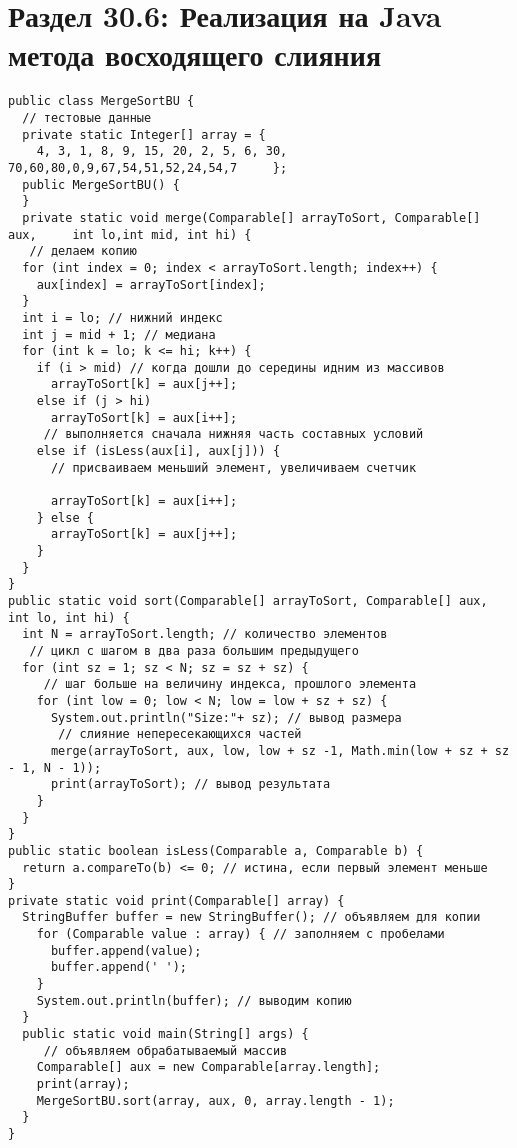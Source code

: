 \section*{Раздел 30.6: Реализация на Java метода восходящего слияния} 
\begin{tcolorbox}
\begin{verbatim}
public class MergeSortBU {
  // тестовые данные
  private static Integer[] array = { 
    4, 3, 1, 8, 9, 15, 20, 2, 5, 6, 30, 70,60,80,0,9,67,54,51,52,24,54,7     };
  public MergeSortBU() {
  }
  private static void merge(Comparable[] arrayToSort, Comparable[] aux,     int lo,int mid, int hi) {
   // делаем копию
  for (int index = 0; index < arrayToSort.length; index++) {
    aux[index] = arrayToSort[index];
  }
  int i = lo; // нижний индекс
  int j = mid + 1; // медиана
  for (int k = lo; k <= hi; k++) {
    if (i > mid) // когда дошли до середины идним из массивов
      arrayToSort[k] = aux[j++];
    else if (j > hi)
      arrayToSort[k] = aux[i++];
     // выполняется сначала нижняя часть составных условий
    else if (isLess(aux[i], aux[j])) {
      // присваиваем меньший элемент, увеличиваем счетчик

      arrayToSort[k] = aux[i++];
    } else {
      arrayToSort[k] = aux[j++];
    }
  }
}
public static void sort(Comparable[] arrayToSort, Comparable[] aux, int lo, int hi) {
  int N = arrayToSort.length; // количество элементов
   // цикл с шагом в два раза большим предыдущего
  for (int sz = 1; sz < N; sz = sz + sz) {
     // шаг больше на величину индекса, прошлого элемента
    for (int low = 0; low < N; low = low + sz + sz) {
      System.out.println("Size:"+ sz); // вывод размера
       // слияние непересекающихся частей
      merge(arrayToSort, aux, low, low + sz -1, Math.min(low + sz + sz - 1, N - 1));
      print(arrayToSort); // вывод результата
    }
  }
}
public static boolean isLess(Comparable a, Comparable b) {
  return a.compareTo(b) <= 0; // истина, если первый элемент меньше
}
private static void print(Comparable[] array) {
  StringBuffer buffer = new StringBuffer(); // объявляем для копии
    for (Comparable value : array) { // заполняем с пробелами
      buffer.append(value);
      buffer.append(' ');
    }
    System.out.println(buffer); // выводим копию
  }
  public static void main(String[] args) {
     // объявляем обрабатываемый массив
    Comparable[] aux = new Comparable[array.length];
    print(array);
    MergeSortBU.sort(array, aux, 0, array.length - 1);
  }
}
\end{verbatim}
\end{tcolorbox}
\newpage
